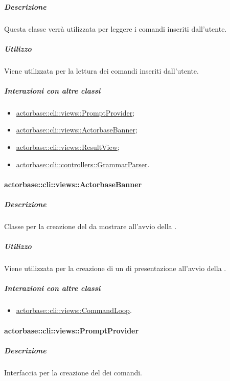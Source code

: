 \documentclass{scalatekids-article}
\begin{document}
\subparagraph{Descrizione}

Questa classe verrà utilizzata per leggere i comandi inseriti dall'utente.

\subparagraph{Utilizzo}

Viene utilizzata per la lettura dei comandi inseriti dall'utente.

\subparagraph{Interazioni con altre classi}

\begin{itemize}
\item \hyperref[sec:actorbase::cli::views::PromptProvider]{actorbase::cli::views::PromptProvider};
\item \hyperref[sec:actorbase::cli::views::ActorbaseBanner]{actorbase::cli::views::ActorbaseBanner};
\item \hyperref[sec:actorbase::cli::views::ResultView]{actorbase::cli::views::ResultView};
\item \hyperref[sec:actorbase::cli::controllers::GrammarParser]{actorbase::cli::controllers::GrammarParser}.
\end{itemize}

\paragraph{actorbase::cli::views::ActorbaseBanner}
\label{sec:actorbase::cli::views::ActorbaseBanner}

\subparagraph{Descrizione}

Classe per la creazione del  da mostrare all'avvio della
.

\subparagraph{Utilizzo}

Viene utilizzata per la creazione di un  di presentazione
all'avvio della .

\subparagraph{Interazioni con altre classi}

\begin{itemize}
\item \hyperref[sec:actorbase::cli::views::CommandLoop]{actorbase::cli::views::CommandLoop}.
\end{itemize}

\paragraph{actorbase::cli::views::PromptProvider}
\label{sec:actorbase::cli::views::PromptProvider}

\subparagraph{Descrizione}

Interfaccia per la creazione del  dei comandi.
\end{document}
